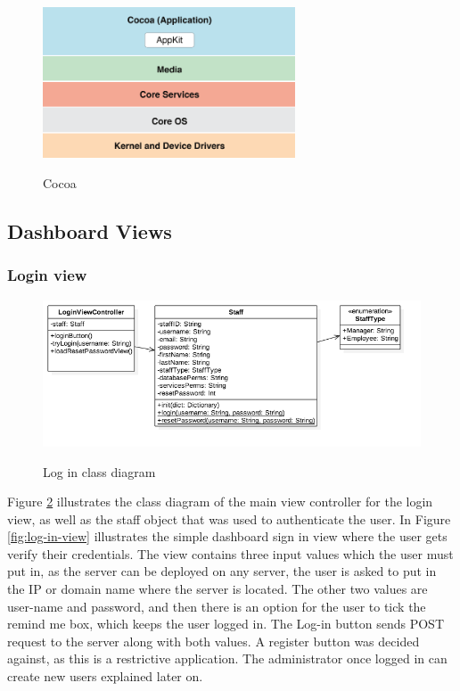 \begin{figure}[!h]
    \caption{Cocoa \cite{cocoa}}
    \centering
    \includegraphics[width=75mm]{images/dashboard/cocoa}
    \label{fig:cocoa}
\end{figure}

\subsection{Dashboard Views}

\subsubsection{Login view}

\begin{figure}[!h]
    \caption{Log in class diagram}
    \centering
    \includegraphics[width=150mm]{images/classdiagrams/Login}
    \label{fig:login_cd}
\end{figure}

Figure \ref{fig:login_cd} illustrates the class diagram of the main view controller for the login view, as well as the staff object that was used to authenticate the user. In Figure \ref{fig:log-in-view} illustrates the simple dashboard sign in view where the user gets verify their credentials. The view contains three input values which the user must put in, as the server can be deployed on any server, the user is asked to put in the IP or domain name where the server is located. The other two values are user-name and password, and then there is an option for the user to tick the remind me box, which keeps the user logged in. The Log-in button sends POST request to the server along with both values. A register button was decided against, as this is a restrictive application. The administrator once logged in can create new users explained later on.

